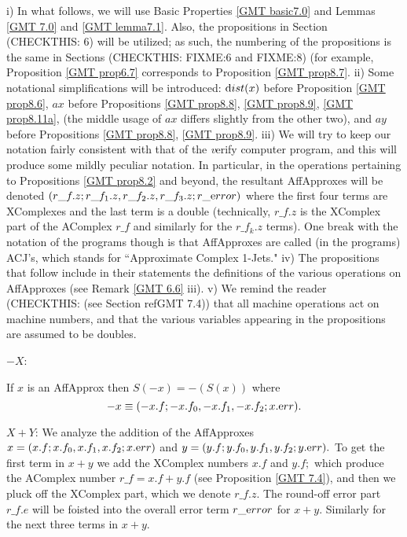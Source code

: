 \begin{conventions}\label{GMT 8.3}
i)  In what follows, we will use Basic Properties \ref{GMT basic7.0} and Lemmas \ref{GMT 7.0} and \ref{GMT lemma7.1}.  Also, the propositions in
	Section (CHECKTHIS: 6)  %
will be utilized;  as such, the numbering of the propositions is the same in
	Sections (CHECKTHIS: FIXME:6 and FIXME:8)  %
(for example, Proposition \ref{GMT prop6.7} corresponds to Proposition \ref{GMT prop8.7}.  
	ii)  Some notational simplifications will be introduced: ${\textrm dist}(x)$ before Proposition \ref{GMT prop8.6}, $ax$ before Propositions \ref{GMT prop8.8}, \ref{GMT prop8.9}, \ref{GMT prop8.11a}, 
	(the middle usage of $ax$ differs slightly from the other two), and $ay$ before Propositions \ref{GMT prop8.8}, \ref{GMT prop8.9}.
	iii)  We will try to keep our notation fairly consistent with that of the {\textit verify} computer program, and this will produce some mildly peculiar notation.  In particular, in the operations pertaining to Propositions \ref{GMT prop8.2} and beyond, the resultant AffApproxes will be denoted $(r\_f.z; r\_f_1.z, r\_f_2.z, 
r\_f_3.z; r\_{\textrm error})$
where the first four terms are XComplexes and the last term is a double (technically, $r\_f.z$ is the XComplex part of the AComplex  $r\_f$ and similarly for the $r\_f_k.z$ terms).  One break with the notation of the programs though is that AffApproxes are called (in the programs) ACJ's, which stands for ``Approximate Complex 1-Jets."
iv) The propositions that follow include in their statements the definitions of the various operations on AffApproxes (see Remark
	\ref{GMT 6.6} iii).
	v)  We remind the reader
	(CHECKTHIS: (see Section ref{GMT 7.4}))  %
	that all machine operations act on machine numbers, and that the 
various variables appearing in the propositions are assumed to be doubles.
\end{conventions}

$-X$:

\begin{proposition}\label{GMT prop8.1}
If $x$ is an AffApprox 
then $S(-x) = -(S(x))$ where
$$-x \equiv (-x.f; -x.f_0,-x.f_1,-x.f_2; x.{\textrm err}).$$ \end{proposition}


$X+Y$:
We analyze the addition of the  {\textrm AffApproxes} 
 $x = (x.f; x.f_0,x.f_1, x.f_2; x.{\textrm err})$  and 
$y = (y.f; y.f_0,y.f_1,y.f_2; y.{\textrm err}).$  To get the first term in $x+y$ we add the XComplex numbers $x.f$ and $y.f;$ which
produce the AComplex number $r\_f = x.f + y.f$ (see Proposition \ref{GMT 7.4}), and then we pluck off the XComplex part,
which we denote $r\_f.z.$  The round-off error part $r\_f.e$ will be foisted into the overall error term $r\_{\textrm error}$
for $x+y.$ Similarly for the next three terms in $x + y.$

